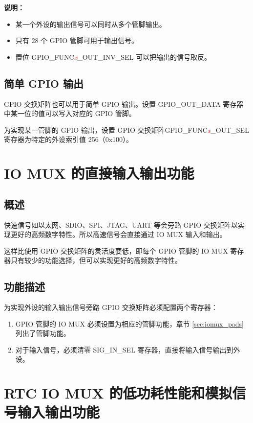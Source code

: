 \documentclass[main\_\_CN.tex]{subfiles}
\begin{document}
{\bfseries 说明：}
\begin{itemize}
\item 某一个外设的输出信号可以同时从多个管脚输出。
\item 只有 28 个 GPIO 管脚可用于输出信号。
\item 置位 GPIO\_FUNC\textcolor{red}{\it{x}}\_OUT\_INV\_SEL 可以把输出的信号取反。
\end{itemize}

\subsection{简单 GPIO 输出}

GPIO 交换矩阵也可以用于简单 GPIO 输出。设置 GPIO\_OUT\_DATA 寄存器中某一位的值可以写入对应的 GPIO 管脚。

为实现某一管脚的 GPIO 输出，设置 GPIO 交换矩阵GPIO\_FUNC\textcolor{red}{\it{x}}\_OUT\_SEL 寄存器为特定的外设索引值 256（0x100）。

\section{IO MUX 的直接输入输出功能}

\subsection{概述}

快速信号如以太网、SDIO、SPI、JTAG、UART 等会旁路 GPIO 交换矩阵以实现更好的高频数字特性。所以高速信号会直接通过 IO MUX 输入和输出。

这样比使用 GPIO 交换矩阵的灵活度要低，即每个 GPIO 管脚的 IO MUX 寄存器只有较少的功能选择，但可以实现更好的高频数字特性。

\subsection{功能描述}\label{direct io via iomux}

为实现外设的输入输出信号旁路 GPIO 交换矩阵必须配置两个寄存器：

\begin{enumerate}
\item GPIO 管脚的 IO MUX 必须设置为相应的管脚功能，章节 \ref{sec:iomux_pads} 列出了管脚功能。
\item 对于输入信号，必须清零 SIG\_IN\_SEL 寄存器，直接将输入信号输出到外设。
\end{enumerate}

\section{RTC IO MUX 的低功耗性能和模拟信号输入输出功能}
\end{document}

